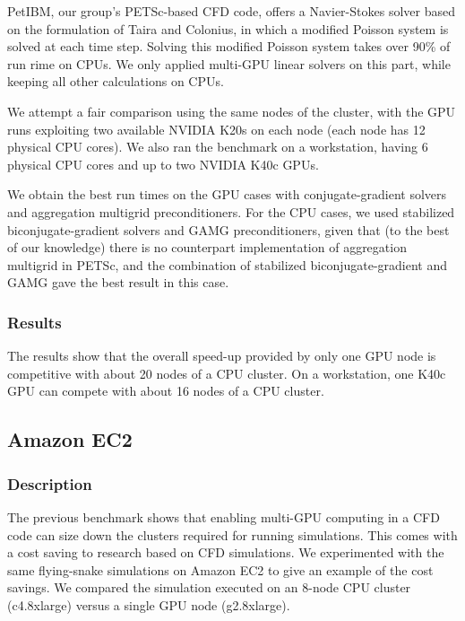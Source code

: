     PetIBM, our group's PETSc-based CFD code, offers a Navier-Stokes solver based on 
    the formulation of Taira and Colonius\cite{Taira-2007-ID69}, in which a modified 
    Poisson system is solved at each time step.
    Solving this modified Poisson system takes over 90\% of run rime on CPUs.
    We only applied multi-GPU linear solvers on this part, while keeping all other
    calculations on CPUs.

    We attempt a fair comparison using the same nodes of the cluster, with
    the GPU runs exploiting two available NVIDIA K20s on each node
    (each node has 12 physical CPU cores).
    We also ran the benchmark on a workstation, having 6 physical 
    CPU cores and up to two NVIDIA K40c GPUs.

    We obtain the best run times on the GPU cases with conjugate-gradient solvers and 
    aggregation multigrid preconditioners.
    For the CPU cases, we used stabilized biconjugate-gradient solvers and GAMG 
    preconditioners, given that (to the best of our knowledge) there is no 
    counterpart implementation of aggregation multigrid in PETSc,
    and the combination of stabilized biconjugate-gradient and GAMG gave 
    the best result in this case.

    \subsubsection{Results}
    The results show that the overall speed-up provided by only one GPU node is 
    competitive with about 20 nodes of a CPU cluster. 
    On a workstation, one K40c GPU can compete with about 16 nodes of a CPU cluster.

\subsection{Amazon EC2}

    \subsubsection{Description}
    The previous benchmark shows that enabling multi-GPU computing in a CFD code can
    size down the clusters required for running simulations.
    This comes with a cost saving to research based on CFD simulations.
    We experimented with the same flying-snake simulations on Amazon EC2 to give 
    an example of the cost savings.
    We compared the simulation executed on an 8-node CPU cluster (c4.8xlarge)
    versus a single GPU node (g2.8xlarge). 


